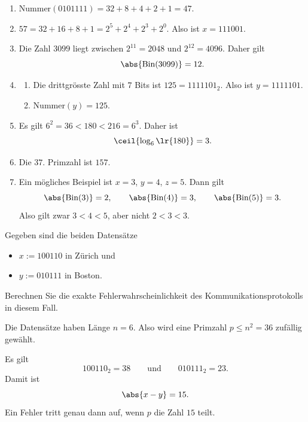 \begin{questions}
\begin{solution}
\begin{enumerate}
	\item \(\text{Nummer}(0101111) = 32 + 8 + 4 + 2 + 1 = 47\).

	\item \(57 = 32 + 16 + 8 + 1 = 2^5 + 2^4 + 2^3 + 2^0\). Also ist \(x = 111001\).

	\item Die Zahl \(3099\) liegt zwischen \(2^{11} = 2048\) und \(2^{12} = 4096\). Daher gilt
	\[
		\abs{\text{Bin}(3099)} = 12.
	\]

	\item
	\begin{enumerate}
		\item Die drittgrösste Zahl mit \(7\) Bits ist \(125 = 1111101_2\). Also ist \(y = 1111101\).
		\item \(\text{Nummer}(y) = 125\).
	\end{enumerate}

	\item Es gilt \(6^2 = 36 < 180 < 216 = 6^3\). Daher ist
	\[
		\ceil{\log_6\lr{180}} = 3.
	\]

	\item Die \(37\). Primzahl ist \(157\).

	\item Ein mögliches Beispiel ist \(x = 3\), \(y = 4\), \(z = 5\). Dann gilt
	\[
		\abs{\text{Bin}(3)} = 2, \qquad
		\abs{\text{Bin}(4)} = 3, \qquad
		\abs{\text{Bin}(5)} = 3.
	\]
	Also gilt zwar \(3 < 4 < 5\), aber nicht \(2 < 3 < 3\).
\end{enumerate}
\end{solution}

\question[3]
Gegeben sind die beiden Datensätze
\begin{itemize}
	\item $x := 100110$ in Zürich und
	\item $y := 010111$ in Boston.
\end{itemize}
Berechnen Sie die exakte Fehlerwahrscheinlichkeit des Kommunikationsprotokolls in diesem Fall.
\vspace{40mm}

\begin{solution}
	Die Datensätze haben Länge \(n = 6\). Also wird eine Primzahl \(p \leq n^2 = 36\) zufällig gewählt.

	Es gilt
	\[
		100110_2 = 38
		\qquad \text{und} \qquad
		010111_2 = 23.
	\]
	Damit ist
	\[
		\abs{x-y} = 15.
	\]
	Ein Fehler tritt genau dann auf, wenn \(p\) die Zahl \(15\) teilt.


\end{solution}
\end{questions}
